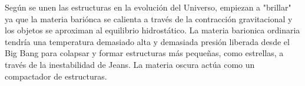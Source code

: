 Según se unen las estructuras en la evolución del Universo, empiezan a "brillar" ya que la materia bariónca se calienta a través de la contracción gravitacional y los objetos se aproximan al equilibrio hidrostático. La materia barionica ordinaria tendría una temperatura demasiado alta y demasiada presión liberada desde el Big Bang para colapsar y formar estructuras más pequeñas, como estrellas, a través de la inestabilidad de Jeans. La materia oscura actúa como un compactador de estructuras. %














